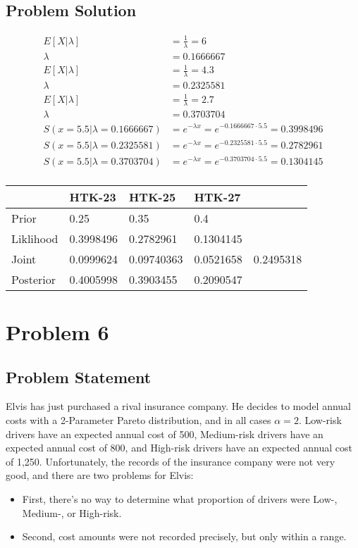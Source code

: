 \documentclass[12pt]{article}
\theoremstyle{definition}
\begin{document}
\subsection*{Problem Solution}
\begin{align*}
E[X|\lambda] &= \frac{1}{\lambda} = 6\\
\lambda &= 0.1666667\\
E[X|\lambda] &= \frac{1}{\lambda} = 4.3\\
\lambda &= 0.2325581\\
E[X|\lambda] &= \frac{1}{\lambda} = 2.7\\
\lambda &= 0.3703704\\
S(x=5.5|\lambda=0.1666667) &= e^{-\lambda x} = e^{-0.1666667 \cdot 5.5}= 0.3998496\\
S(x=5.5|\lambda=0.2325581) &= e^{-\lambda x} = e^{-0.2325581 \cdot 5.5}= 0.2782961\\
S(x=5.5|\lambda=0.3703704) &= e^{-\lambda x} = e^{-0.3703704 \cdot 5.5}= 0.1304145\\
\end{align*}
\begin{tabular}{lllll}
&   HTK-23   &   HTK-25   &   HTK-27   \\
\hline
Prior      &   0.25   &   0.35   &   0.4   &\\
Liklihood  &   0.3998496   &   0.2782961   &   0.1304145   &\\
Joint      &   0.0999624   &   0.09740363   &   0.0521658   &   0.2495318\\
Posterior  &   0.4005998   &   0.3903455   &   0.2090547   &\\
\hline
\end{tabular}



\newpage
\section*{Problem 6}

\subsection*{Problem Statement}

Elvis has just purchased a rival insurance company. He decides to model annual costs with a 2-Parameter Pareto distribution, and in all cases $\alpha = 2$. Low-risk drivers have an expected annual cost of 500, Medium-risk drivers have an expected annual cost of 800, and High-risk drivers have an expected annual cost of 1,250. Unfortunately, the records of the insurance company were not very good, and there are two problems for Elvis:
\begin{itemize}
	\item First, there's no way to determine what proportion of drivers were Low-, Medium-, or High-risk.
	\item Second, cost amounts were not recorded precisely, but only within a range.
\end{itemize}
\end{document}
